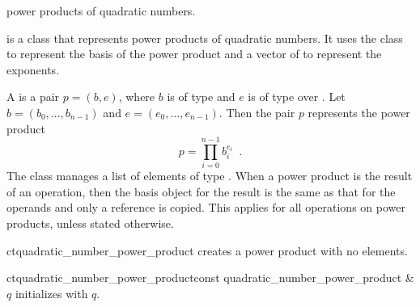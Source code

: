 
\newcommand{\num}{\mathit{num}}
\newcommand{\den}{\mathit{den}}



\NAME

 \dotfill power products of quadratic numbers.



\ABSTRACT

 is a class that represents power products of quadratic
numbers.  It uses the class  to represent the basis of
the power product and a vector of  to represent the exponents.



\DESCRIPTION

A  is a pair $p = (b,e)$, where $b$ is of type
 and $e$ is of type  over
.  Let $b = (b_{0}, \dots, b_{n-1})$ and $e = (e_{0}, \dots, e_{n-1})$.  Then the
pair $p$ represents the power product
\begin{displaymath}
  p = \prod_{i=0}^{n-1} b_{i}^{e_{i}} \enspace.
\end{displaymath}
The class manages a list of elements of type .  When a
power product is the result of an operation, then the basis object for the result is the same as
that for the operands and only a reference is copied.  This applies for all operations on power
products, unless stated otherwise.



\CONS

\begin{fcode}{ct}{quadratic_number_power_product}{}
  creates a power product with no elements.
\end{fcode}

\begin{fcode}{ct}{quadratic_number_power_product}{const quadratic_number_power_product & $q$}
  initializes with $q$.
\end{fcode}


